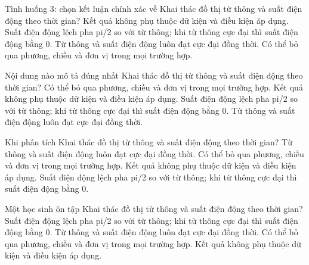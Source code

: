 \begin{ex}
Tình huống 3: chọn kết luận chính xác về Khai thác đồ thị từ thông và suất điện động theo thời gian?
\choice
{Kết quả không phụ thuộc dữ kiện và điều kiện áp dụng.}
{\True Suất điện động lệch pha pi/2 so với từ thông; khi từ thông cực đại thì suất điện động bằng 0.}
{Từ thông và suất điện động luôn đạt cực đại đồng thời.}
{Có thể bỏ qua phương, chiều và đơn vị trong mọi trường hợp.}
\end{ex}

\begin{ex}
Nội dung nào mô tả đúng nhất Khai thác đồ thị từ thông và suất điện động theo thời gian?
\choice
{Có thể bỏ qua phương, chiều và đơn vị trong mọi trường hợp.}
{Kết quả không phụ thuộc dữ kiện và điều kiện áp dụng.}
{\True Suất điện động lệch pha pi/2 so với từ thông; khi từ thông cực đại thì suất điện động bằng 0.}
{Từ thông và suất điện động luôn đạt cực đại đồng thời.}
\end{ex}

\begin{ex}
Khi phân tích Khai thác đồ thị từ thông và suất điện động theo thời gian?
\choice
{Từ thông và suất điện động luôn đạt cực đại đồng thời.}
{Có thể bỏ qua phương, chiều và đơn vị trong mọi trường hợp.}
{Kết quả không phụ thuộc dữ kiện và điều kiện áp dụng.}
{\True Suất điện động lệch pha pi/2 so với từ thông; khi từ thông cực đại thì suất điện động bằng 0.}
\end{ex}

\begin{ex}
Một học sinh ôn tập Khai thác đồ thị từ thông và suất điện động theo thời gian?
\choice
{\True Suất điện động lệch pha pi/2 so với từ thông; khi từ thông cực đại thì suất điện động bằng 0.}
{Từ thông và suất điện động luôn đạt cực đại đồng thời.}
{Có thể bỏ qua phương, chiều và đơn vị trong mọi trường hợp.}
{Kết quả không phụ thuộc dữ kiện và điều kiện áp dụng.}
\end{ex}

